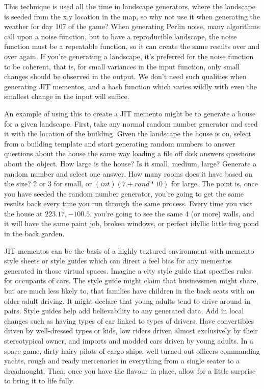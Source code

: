 \documentclass[a4paper,12pt]{article}
\begin{document}
This technique is used all the time in landscape generators, where the landscape is seeded from the x,y location in the map, so why not use it when generating the weather for day 107 of the game?
When generating Perlin noise, many algorithms call upon a noise function, but to have a reproducible landscape, the noise function must be a repeatable function, so it can create the same results over and over again.
If you're generating a landscape, it's preferred for the noise function to be coherent, that is, for small variances in the input function, only small changes should be observed in the output.
We don't need such qualities when generating JIT mementos, and a hash function which varies wildly with even the smallest change in the input will suffice.

An example of using this to create a JIT memento might be to generate a house for a given landscape.
First, take any normal random number generator and seed it with the location of the building.
Given the landscape the house is on, select from a building template and start generating random numbers to answer questions about the house the same way loading a file off disk answers questions about the object.
How large is the house?
Is it small, medium, large?
Generate a random number and select one answer.
How many rooms does it have based on the size?
2 or 3 for small, or $(int)(7 + rand * 10)$ for large.
The point is, once you have seeded the random number generator, you're going to get the same results back every time you run through the same process.
Every time you visit the house at ${223.17,-100.5}$, you're going to see the same 4 (or more) walls, and it will have the same paint job, broken windows, or perfect idyllic little frog pond in the back garden.

JIT mementos can be the basis of a highly textured environment with memento style sheets or style guides which can direct a feel bias for any mementos generated in those virtual spaces.
Imagine a city style guide that specifies rules for occupants of cars.
The style guide might claim that businessmen might share, but are much less likely to, that families have children in the back seats with an older adult driving.
It might declare that young adults tend to drive around in pairs.
Style guides help add believability to any generated data.
Add in local changes such as having types of car linked to types of drivers.
Have convertibles driven by well-dressed types or kids, low riders driven almost exclusively by their stereotypical owner, and imports and modded cars driven by young adults.
In a space game, dirty hairy pilots of cargo ships, well turned out officers commanding yachts, rough and ready mercenaries in everything from a single seater to a dreadnought. Then, once you have the flavour in place, allow for a little surprise to bring it to life fully.
\end{document}
